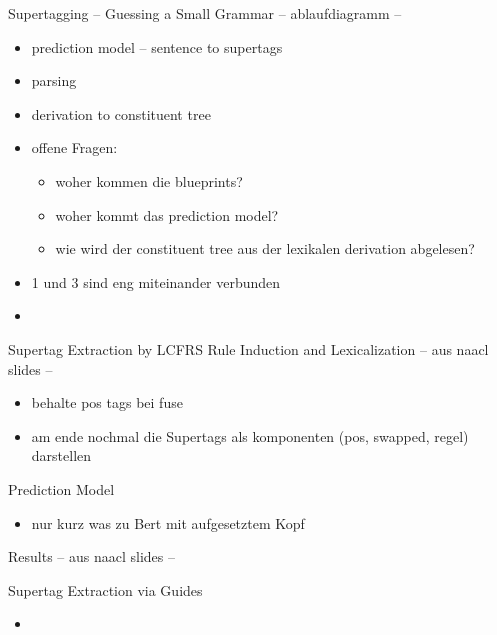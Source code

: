 \documentclass{beamer}
\begin{document}
    \begin{frame}{Supertagging -- Guessing a Small Grammar}
        -- ablaufdiagramm --
        \begin{itemize}
            \item prediction model -- sentence to supertags
            \item parsing
            \item derivation to constituent tree
            \item offene Fragen:
            \begin{itemize}
                \item woher kommen die blueprints?
                \item woher kommt das prediction model?
                \item wie wird der constituent tree aus der lexikalen derivation abgelesen?
            \end{itemize}
            \item 1 und 3 sind eng miteinander verbunden
            \item
        \end{itemize}
    \end{frame}

    \begin{frame}{Supertag Extraction by LCFRS Rule Induction and Lexicalization}
        -- aus naacl slides --
        \begin{itemize}
            \item behalte pos tags bei fuse
            \item am ende nochmal die Supertags als komponenten (pos, swapped, regel) darstellen
        \end{itemize}
    \end{frame}

    \begin{frame}{Prediction Model}
        \begin{itemize}
            \item nur kurz was zu Bert mit aufgesetztem Kopf
        \end{itemize}
    \end{frame}

    \begin{frame}{Results}
        -- aus naacl slides --
    \end{frame}

    \begin{frame}{Supertag Extraction via Guides}
        \begin{itemize}
            \item
        \end{itemize}
    \end{frame}
\end{document}
